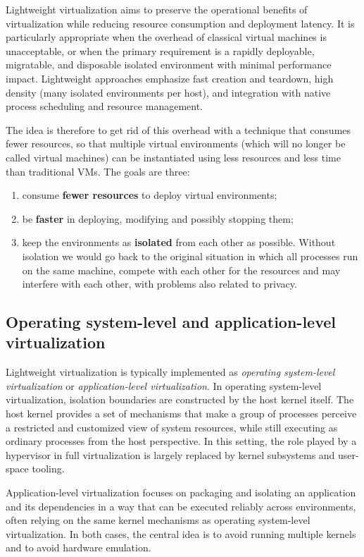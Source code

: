 Lightweight virtualization aims to preserve the operational benefits of virtualization while reducing resource consumption and deployment latency. It is particularly appropriate when the overhead of classical virtual machines is unacceptable, or when the primary requirement is a rapidly deployable, migratable, and disposable isolated environment with minimal performance impact. Lightweight approaches emphasize fast creation and teardown, high density (many isolated environments per host), and integration with native process scheduling and resource management.

The idea is therefore to get rid of this overhead with a technique that consumes fewer resources, so that multiple virtual environments (which will no longer be called virtual machines) can be instantiated using less resources and less time than traditional VMs. The goals are three:

\begin{enumerate}
\item consume \textbf{fewer resources} to deploy virtual environments;
\item be \textbf{faster} in deploying, modifying and possibly stopping them;
\item keep the environments as \textbf{isolated} from each other as possible. Without isolation we would go back to the original situation in which all processes run on the same machine, compete with each other for the resources and may interfere with each other, with problems also related to privacy.
\end{enumerate}

\subsection{Operating system-level and application-level virtualization}

Lightweight virtualization is typically implemented as \emph{operating system-level virtualization} or \emph{application-level virtualization}. In operating system-level virtualization, isolation boundaries are constructed by the host kernel itself. The host kernel provides a set of mechanisms that make a group of processes perceive a restricted and customized view of system resources, while still executing as ordinary processes from the host perspective. In this setting, the role played by a hypervisor in full virtualization is largely replaced by kernel subsystems and user-space tooling.

Application-level virtualization focuses on packaging and isolating an application and its dependencies in a way that can be executed reliably across environments, often relying on the same kernel mechanisms as operating system-level virtualization. In both cases, the central idea is to avoid running multiple kernels and to avoid hardware emulation.

